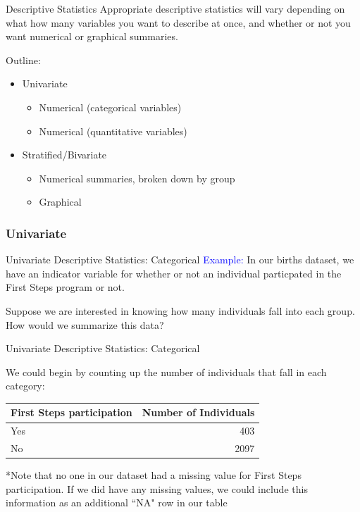 \documentclass[10pt,t]{beamer}
\begin{document}
\begin{frame}{Descriptive Statistics}
Appropriate descriptive statistics will vary depending on what how many variables you want to describe at once, and whether or not you want numerical or graphical summaries.

\vspace{0.3cm}

Outline:
\begin{itemize}
	\item Univariate
	\begin{itemize}
		\item Numerical (categorical variables)
		\item Numerical (quantitative variables)
	\end{itemize}
	\item Stratified/Bivariate
	\begin{itemize}
		\item Numerical summaries, broken down by group
		\item Graphical
	\end{itemize}
\end{itemize}
\end{frame}

\subsubsection{Univariate}

\begin{frame}{Univariate Descriptive Statistics: Categorical}
\textcolor{blue}{Example:} In our births dataset, we have an indicator variable for whether or not an individual particpated in the First Steps program or not.

\vspace{0.3cm}

Suppose we are interested in knowing how many individuals fall into each group. How would we summarize this data?

\end{frame}

\begin{frame}{Univariate Descriptive Statistics: Categorical}

We could begin by counting up the number of individuals that fall in each category:

\vspace{0.3cm}

\begin{table}
	\centering
	\begin{tabular}{l|r}
		\textbf{First Steps participation} & \textbf{Number of Individuals} \\
		\hline
		Yes & 403\\
		\hline
		No & 2097
	\end{tabular}
\end{table}


\vspace{0.3cm}

*Note that no one in our dataset had a missing value for First Steps participation. If we did have any missing values, we could include this information as an additional ``NA" row in our table

\end{frame}
\end{document}
